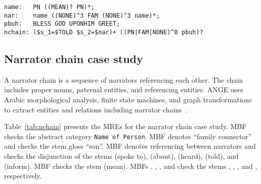 \setarab
\begin{table}[tb!]
  \centering
  \caption{Narrator chain example.}
  \begin{Verbatim}[xleftmargin=1.5cm,fontsize=\relsize{-1},commandchars=\\\{\},codes={\catcode`$=3 \catcode`_=8}]
name:   PN ((MEAN)? PN)*;
nar:    name ((NONE)^3 FAM (NONE)^3 name)*;
pbuh:   BLESS GOD UPONHIM GREET;
nchain: ($s_1=$TOLD $s_2=$nar)+ ((PN|FAM|NONE)^8 pbuh)?
\end{Verbatim}
  \label{tab:nchain}%
\end{table}%

\subsection{Narrator chain case study}
A narrator chain is a sequence of narrators referencing each other. 
The chain includes proper nouns, paternal entities, and referencing entities. 
ANGE uses Arabic morphological analysis, finite state machines, and graph transformations 
to extract entities and relations including narrator chains~\cite{ZaMaFlairs2012HadithBio}.

\transfalse
Table~\ref{tab:nchain} presents the MREs for the narrator chain case study. 
MBF  checks the abstract category {\tt Name of Person}. 
MBF  denotes ``family connector'' and checks the stem gloss ``son''. 
MBF  denotes referencing between narrators and checks the disjunction of 
the stems (spoke to), (about), (heard), (told), and (inform). 
MBF  checks the stem (mean). 
MBFs , , , and  check the 
stems , , , and , respectively. 
\transtrue

